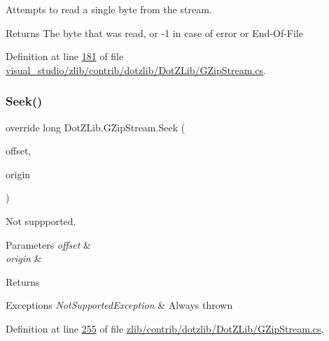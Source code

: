 Attempts to read a single byte from the stream. 

\begin{DoxyReturn}{Returns}
The byte that was read, or -\/1 in case of error or End-\/\+Of-\/\+File
\end{DoxyReturn}


Definition at line \hyperlink{visual__studio_2zlib_2contrib_2dotzlib_2_dot_z_lib_2_g_zip_stream_8cs_source_l00181}{181} of file \hyperlink{visual__studio_2zlib_2contrib_2dotzlib_2_dot_z_lib_2_g_zip_stream_8cs_source}{visual\+\_\+studio/zlib/contrib/dotzlib/\+Dot\+Z\+Lib/\+G\+Zip\+Stream.\+cs}.

\mbox{\label{class_dot_z_lib_1_1_g_zip_stream_adbb50684c05ca060cff804c91c63f4a2}} 
\subsubsection{\texorpdfstring{Seek()}{Seek()}\hspace{0.1cm}{\footnotesize\ttfamily [1/2]}}
{\footnotesize\ttfamily override long Dot\+Z\+Lib.\+G\+Zip\+Stream.\+Seek (\begin{DoxyParamCaption}\item[{long}]{offset,  }\item[{Seek\+Origin}]{origin }\end{DoxyParamCaption})\hspace{0.3cm}{\ttfamily [inline]}}



Not suppported. 


\begin{DoxyParams}{Parameters}
{\em offset} & \\
\hline
{\em origin} & \\
\hline
\end{DoxyParams}
\begin{DoxyReturn}{Returns}

\end{DoxyReturn}

\begin{DoxyExceptions}{Exceptions}
{\em Not\+Supported\+Exception} & Always thrown\\
\hline
\end{DoxyExceptions}


Definition at line \hyperlink{zlib_2contrib_2dotzlib_2_dot_z_lib_2_g_zip_stream_8cs_source_l00255}{255} of file \hyperlink{zlib_2contrib_2dotzlib_2_dot_z_lib_2_g_zip_stream_8cs_source}{zlib/contrib/dotzlib/\+Dot\+Z\+Lib/\+G\+Zip\+Stream.\+cs}.

